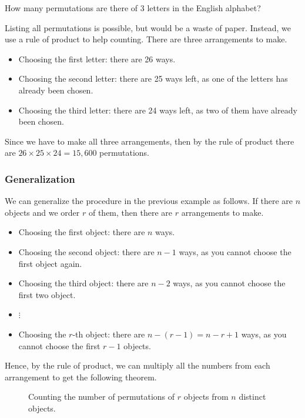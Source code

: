 \begin{frame}[t]
\begin{ex}
How many permutations are there of 3 letters in the English alphabet?
\end{ex}
\begin{sol}
Listing all permutations is possible, but would be a waste of paper. Instead, we use a rule of product to help counting. There are three arrangements to make.
\begin{itemize}
\item Choosing the first letter: there are 26 ways.
\item Choosing the second letter: there are 25 ways left, as one of the letters has already been chosen.
\item Choosing the third letter: there are 24 ways left, as two of them have already been chosen.
\end{itemize}
Since we have to make all three arrangements, then by the rule of product there are $26 \times 25 \times 24 = 15,600$ permutations.
\end{sol}
\end{frame}

\begin{frame}[t]
\frametitle{Generalization}
\begin{slide}
We can generalize the procedure in the previous example as follows. If there are $n$ objects and we order $r$ of them, then there are $r$ arrangements to make.
\begin{itemize}
\item Choosing the first object: there are $n$ ways.
\item Choosing the second object: there are $n-1$ ways, as you cannot choose the first object again.
\item Choosing the third object: there are $n-2$ ways, as you cannot choose the first two object.
\item $\vdots$
\item Choosing the $r$-th object: there are $n-(r-1) = n-r+1$ ways, as you cannot choose the first $r-1$ objects.
\end{itemize}
Hence, by the rule of product, we can multiply all the numbers from each arrangement to get the following theorem.
\end{slide}
\end{frame}

\begin{frame}{}
\begin{figure}[h!]
\caption{Counting the number of permutations of $r$ objects from $n$ distinct objects.}
\end{figure}
\end{frame}

